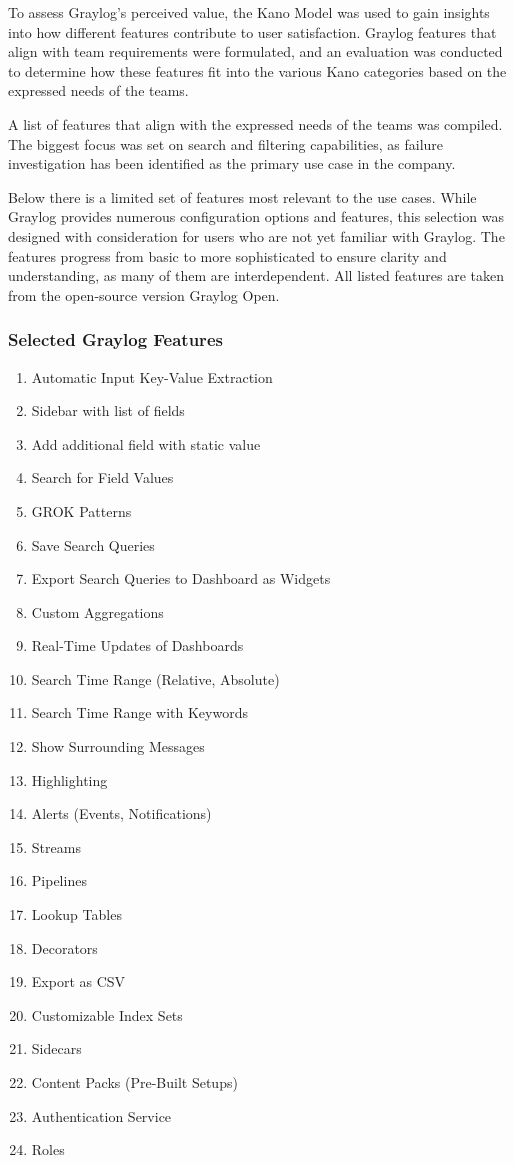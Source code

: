 \documentclass[../main.tex]{subfiles}
\begin{document}
To assess Graylog's perceived value, the Kano Model was used to gain insights into how different features contribute to user satisfaction. Graylog features that align with team requirements were formulated, and an evaluation was conducted to determine how these features fit into the various Kano categories based on the expressed needs of the teams.

A list of features that align with the expressed needs of the teams was compiled. The biggest focus was set on search and filtering capabilities, as failure investigation has been identified as the primary use case in the company.

Below there is a limited set of features most relevant to the use cases. While Graylog provides numerous configuration options and features, this selection was designed with consideration for users who are not yet familiar with Graylog. The features progress from basic to more sophisticated to ensure clarity and understanding, as many of them are interdependent. All listed features are taken from the open-source version Graylog Open.

\subsubsection{Selected Graylog Features}

\begin{enumerate}
    \item Automatic Input Key-Value Extraction
    \item Sidebar with list of fields
    \item Add additional field with static value
    \item Search for Field Values
    \item GROK Patterns
    \item Save Search Queries
    \item Export Search Queries to Dashboard as Widgets
    \item Custom Aggregations
    \item Real-Time Updates of Dashboards
    \item Search Time Range (Relative, Absolute)
    \item Search Time Range with Keywords
    \item Show Surrounding Messages
    \item Highlighting
    \item Alerts (Events, Notifications)
    \item Streams
    \item Pipelines
    \item Lookup Tables
    \item Decorators
    \item Export as CSV
    \item Customizable Index Sets
    \item Sidecars
    \item Content Packs (Pre-Built Setups)
    \item Authentication Service
    \item Roles
\end{enumerate}
\end{document}

